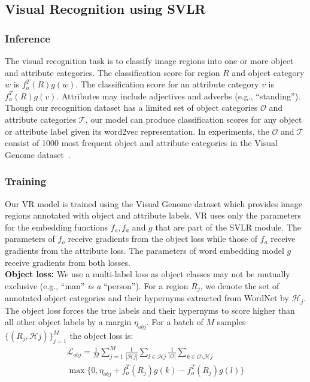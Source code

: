 \documentclass[10pt,twocolumn,letterpaper]{article}
\begin{document}
\subsection{Visual Recognition using SVLR}
\label{sec:vr}
\subsubsection{Inference}\label{sec:recog_inference}
The visual recognition task is to classify image regions into one or more object and attribute categories. The classification score for region $R$ and object category $w$ is $f_o^T(R)g(w)$. The classification score for an attribute category $v$ is $f_a^T(R)g(v)$. Attributes may include adjectives and adverbs (e.g., ``standing''). Though our recognition dataset has a limited set of object categories $\mathcal{O}$ and attribute categories $\mathcal{T}$,  our model can produce classification scores for any object or attribute label given its word2vec representation. In experiments, the $\mathcal{O}$ and $\mathcal{T}$ consist of 1000 most frequent object and attribute categories in the Visual Genome dataset~\cite{krishna2016visual}. 

\vspace{-3mm}
\subsubsection{Training}\label{sec:recog_learn}
Our VR model is trained using the Visual Genome dataset which provides image regions annotated with object and attribute labels. VR uses only the parameters for the embedding functions $f_o, f_a$ and $g$ that are part of the SVLR module. The parameters of $f_o$ receive gradients from the object loss while those of $f_a$ receive gradients from the attribute loss. The parameters of word embedding model $g$ receive gradients from both losses.\\

\noindent 
\textbf{Object loss:} %
We use a multi-label loss as object classes may not be mutually exclusive (e.g., ``man'' \emph{is a} ``person''). For a region $R_j$, we denote the set of annotated object categories and their hypernyms extracted from WordNet \cite{miller1995acm} by $\mathcal{H}_j$. The object loss forces the true labels and their hypernyms to score higher than all other object labels by a margin $\eta_{obj}$. For a batch of $M$ samples $\{(R_j,\mathcal{H}j)\}_{j=1}^{M}$ the object loss is:
\vspace{-5mm}
\begin{multline}
\mathcal{L}_{obj} = \frac{1}{M}\sum_{j=1}^{M}\frac{1}{|\mathcal{H}j|}\sum_{l \in \mathcal{H}j} \frac{1}{|\mathcal{O}|}
\sum_{k \in \mathcal{O}\setminus \mathcal{H}j} \\
\max\{0,\eta_{obj} + f_o^T(R_j)g(k) - f_o^T(R_j)g(l)\}
\end{multline}
\end{document}
